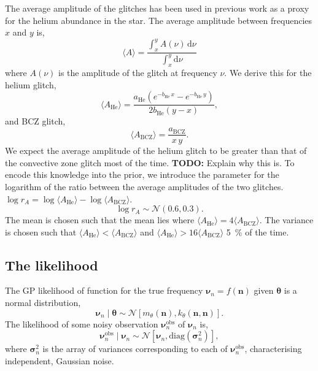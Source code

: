 \documentclass[linenumbers,modern,astrosymb,times]{aastex631dm}
\newcommand{\helium}{\mathrm{He}}
\newcommand{\bcz}{\mathrm{BCZ}}
\newcommand{\dd}{\mathrm{d}}
\newcommand{\todo}[1]{{\color{todo} \textbf{TODO:} #1}}
\begin{document}
The average amplitude of the glitches has been used in previous work as a proxy
for the helium abundance in the star. The average amplitude between frequencies
\(x\) and \(y\) is,
%
\begin{equation}
    \langle A \rangle = \frac{
        \int_{x}^{y} A(\nu) \, \dd \nu
    }{
        \int_{x}^{y} \dd \nu
    }
\end{equation}
%
where \(A(\nu)\) is the amplitude of the glitch at frequency \(\nu\). We derive
this for the helium glitch,
%
\begin{equation}
    \langle A_\helium \rangle = \frac{
        a_\helium \left(
        e^{- b_\helium \, x}
        - e^{- b_\helium \, y}
        \right)
    }{2 b_\helium (y - x)},
\end{equation}
%
and BCZ glitch,
%
\begin{equation}
    \langle A_\bcz \rangle
    = \frac{a_\bcz}{x \, y}.
\end{equation}
%
We expect the average amplitude of the helium glitch to be greater than that of
the convective zone glitch most of the time. \todo{Explain why this is.} To
encode this knowledge into the prior, we introduce the parameter for the
logarithm of the ratio between the average amplitudes of the two glitches.
\(\log r_A = \log \langle A_\helium \rangle - \log \langle A_\bcz \rangle\).
%
\begin{equation}
    \log r_A \sim \mathcal{N}(0.6, 0.3).
\end{equation}
%
The mean is chosen such that the mean lies where
\(\langle A_\helium \rangle = 4 \langle A_\bcz \rangle\). The variance is
chosen such that \(\langle A_\helium \rangle < \langle A_\bcz \rangle\) and
\(\langle A_\helium \rangle > 16 \langle A_\bcz \rangle\) \SI{5}{\percent} of
the time.

\subsection{The likelihood}

The GP likelihood of function for the true frequency \(\bm \nu_n = f(\bm n)\)
given \(\bm\theta\) is a normal distribution,
%
\begin{equation}
    \bm \nu_n \mid \bm\theta \sim
    \mathcal{N}\left[m_\theta(\bm n), k_\theta(\bm n, \bm n)\right].
\end{equation}
%
The likelihood of some noisy observation \(\bm \nu^\mathrm{obs}_n\) of
\(\bm \nu_n\) is,
%
\begin{equation}
    \bm\nu^\mathrm{obs}_n \mid \bm \nu_n
    \sim \mathcal{N}\left[\bm \nu_n, \mathrm{diag}(\bm\sigma_n^2)\right],
\end{equation}
%
where \(\bm\sigma_n^2\) is the array of variances corresponding to
each of \(\bm\nu^\mathrm{obs}_n\), characterising independent, Gaussian noise.
\end{document}
